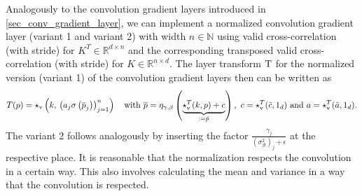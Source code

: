 \documentclass[twoside,a4paper]{article}
\begin{document}
Analogously to the convolution gradient layers introduced in \cref{sec_conv_gradient_layer},
we can implement a normalized convolution gradient layer (variant 1 and variant 2) 
with width $n \in \mathbb{N}$
using valid cross-correlation (with stride) for $K^T \in \mathbb{R}^{d \times n}$ and the
corresponding transposed valid cross-correlation (with stride) for $K \in \mathbb{R}^{n \times d}$.
The layer transform $\mathrm{T}$ for the normalized version (variant 1) of the convolution gradient
layers then can be written as
\begin{equation*}
	T(p) = \star_{\text{v}} \left( k, \, \left( a_j \sigma \left( \overline{p}_j \right) \right)_{j=1}^n \right) 
	\quad
	\text{with } \overline{p} = 
	\eta_{\gamma, \beta} \left( \underbrace{\star_{\text{v}}^T(k,p) + c}_{:= \tilde{p}} \right)
	\text{, }\, c = \star_{\text{v}}^T(\tilde{c},1_d) 
	\text{ and } a = \star_{\text{v}}^T(\tilde{a},1_d)
	.
\end{equation*}
The variant 2 follows analogously by inserting the factor 
$\frac{\gamma_j}{(\sigma^2_\mathcal{B})_j + \epsilon}$ at the respective place.
It is reasonable that the normalization respects the convolution in a certain way.
This also involves calculating the mean and variance in a way that the convolution is respected.
\end{document}
